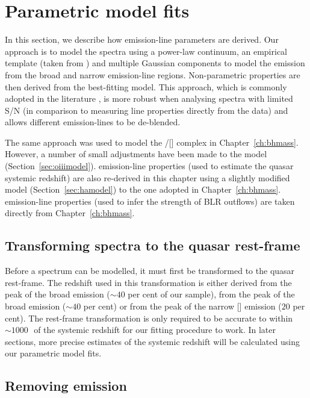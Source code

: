 \section{Parametric model fits}

In this section, we describe how emission-line parameters are derived. 
Our approach is to model the spectra using a power-law continuum, an empirical  template (taken from \citealt{boroson92}) and multiple Gaussian components to model the emission from the broad and narrow emission-line regions.
Non-parametric properties are then derived from the best-fitting model. 
This approach, which is commonly adopted in the literature \citep[e.g.][]{shen11,shen12,shen16a}, is more robust when analysing spectra with limited S/N (in comparison to measuring line properties directly from the data) and allows different emission-lines to be de-blended.

The same approach was used to model the \hbns/[] complex in Chapter~\ref{ch:bhmass}. 
However, a number of small adjustments have been made to the model (Section~\ref{sec:oiiimodel}). 
\ha emission-line properties (used to estimate the quasar systemic redshift) are also re-derived in this chapter using a slightly modified model (Section~\ref{sec:hamodel}) to the one adopted in Chapter~\ref{ch:bhmass}. 
 emission-line properties (used to infer the strength of BLR outflows) are taken directly from Chapter~\ref{ch:bhmass}. 

\subsection{Transforming spectra to the quasar rest-frame}

Before a spectrum can be modelled, it must first be transformed to the quasar rest-frame.  
The redshift used in this transformation is either derived from the peak of the broad \ha emission ($\sim40$ per cent of our sample), from the peak of the broad \hb emission ($\sim40$ per cent) or from the peak of the narrow [] emission ($20$ per cent).
The rest-frame transformation is only required to be accurate to within $\sim1000$\,\kms\, of the systemic redshift for our fitting procedure to work. 
In later sections, more precise estimates of the systemic redshift will be calculated using our parametric model fits. 

\subsection{Removing  emission}

